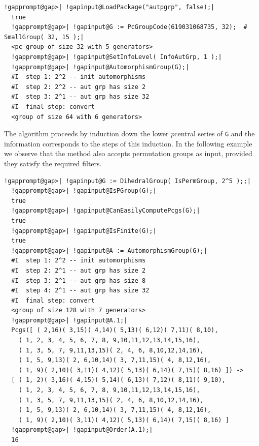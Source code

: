 \documentclass[a4paper,11pt]{report}
\begin{document}
{{{ 
\begin{Verbatim}[commandchars=!@|,fontsize=\small,frame=single,label=Example]
  !gapprompt@gap>| !gapinput@LoadPackage("autpgrp", false);|
  true
  !gapprompt@gap>| !gapinput@G := PcGroupCode(619031068735, 32);  # SmallGroup( 32, 15 );|
  <pc group of size 32 with 5 generators>
  !gapprompt@gap>| !gapinput@SetInfoLevel( InfoAutGrp, 1 );|
  !gapprompt@gap>| !gapinput@AutomorphismGroup(G);|
  #I  step 1: 2^2 -- init automorphisms
  #I  step 2: 2^2 -- aut grp has size 2
  #I  step 3: 2^1 -- aut grp has size 32
  #I  final step: convert
  <group of size 64 with 6 generators>
\end{Verbatim}
 

 The algorithm proceeds by induction down the lower $p$\texttt{}central series of \texttt{G} and the information corresponds to the steps of this induction. In the
following example we observe that the method also accepts permutation groups
as input, provided they satisfy the required filters. 

 
\begin{Verbatim}[commandchars=!@|,fontsize=\small,frame=single,label=Example]
  !gapprompt@gap>| !gapinput@G := DihedralGroup( IsPermGroup, 2^5 );;|
  !gapprompt@gap>| !gapinput@IsPGroup(G);|
  true
  !gapprompt@gap>| !gapinput@CanEasilyComputePcgs(G);|
  true
  !gapprompt@gap>| !gapinput@IsFinite(G);|
  true
  !gapprompt@gap>| !gapinput@A := AutomorphismGroup(G);|
  #I  step 1: 2^2 -- init automorphisms
  #I  step 2: 2^1 -- aut grp has size 2
  #I  step 3: 2^1 -- aut grp has size 8
  #I  step 4: 2^1 -- aut grp has size 32
  #I  final step: convert
  <group of size 128 with 7 generators>
  !gapprompt@gap>| !gapinput@A.1;|
  Pcgs([ ( 2,16)( 3,15)( 4,14)( 5,13)( 6,12)( 7,11)( 8,10),
    ( 1, 2, 3, 4, 5, 6, 7, 8, 9,10,11,12,13,14,15,16),
    ( 1, 3, 5, 7, 9,11,13,15)( 2, 4, 6, 8,10,12,14,16),
    ( 1, 5, 9,13)( 2, 6,10,14)( 3, 7,11,15)( 4, 8,12,16),
    ( 1, 9)( 2,10)( 3,11)( 4,12)( 5,13)( 6,14)( 7,15)( 8,16) ]) ->
  [ ( 1, 2)( 3,16)( 4,15)( 5,14)( 6,13)( 7,12)( 8,11)( 9,10),
    ( 1, 2, 3, 4, 5, 6, 7, 8, 9,10,11,12,13,14,15,16),
    ( 1, 3, 5, 7, 9,11,13,15)( 2, 4, 6, 8,10,12,14,16),
    ( 1, 5, 9,13)( 2, 6,10,14)( 3, 7,11,15)( 4, 8,12,16),
    ( 1, 9)( 2,10)( 3,11)( 4,12)( 5,13)( 6,14)( 7,15)( 8,16) ]
  !gapprompt@gap>| !gapinput@Order(A.1);|
  16
\end{Verbatim}
 }

 }

 }

 
\end{document}
